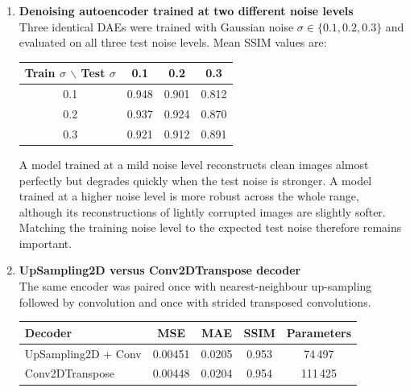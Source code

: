 \documentclass[10pt]{article}
\begin{document}
\begin{enumerate}
Each model works best on the noise it saw during training. The Gaussian-trained network still removes moderate salt-and-pepper corruption reasonably well, while the salt-and-pepper network struggles more with additive Gaussian noise. This shows that the denoising autoencoder learns noise-specific features rather than a completely universal cleaner.\\

\item \textbf{Denoising autoencoder trained at two different noise levels}
\\[0.3em]
Three identical DAEs were trained with Gaussian noise $\sigma\in\{0.1,0.2,0.3\}$ and evaluated on all three test noise levels. Mean SSIM values are:

\begin{center}
\begin{tabular}{|c|c|c|c|}
\hline
Train $\sigma$ $\backslash$ Test $\sigma$ & 0.1 & 0.2 & 0.3 \\
\hline
0.1 & 0.948 & 0.901 & 0.812 \\
0.2 & 0.937 & 0.924 & 0.870 \\
0.3 & 0.921 & 0.912 & 0.891 \\
\hline
\end{tabular}
\end{center}

A model trained at a mild noise level reconstructs clean images almost perfectly but degrades quickly when the test noise is stronger. A model trained at a higher noise level is more robust across the whole range, although its reconstructions of lightly corrupted images are slightly softer. Matching the training noise level to the expected test noise therefore remains important.\\

\item \textbf{UpSampling2D versus Conv2DTranspose decoder}
\\[0.3em]
The same encoder was paired once with nearest-neighbour up-sampling followed by convolution and once with strided transposed convolutions.

\begin{center}
\begin{tabular}{|l|c|c|c|c|}
\hline
Decoder & MSE & MAE & SSIM & Parameters \\
\hline
UpSampling2D + Conv & 0.00451 & 0.0205 & 0.953 & 74\,497 \\
Conv2DTranspose     & 0.00448 & 0.0204 & 0.954 & 111\,425 \\
\hline
\end{tabular}
\end{center}


\end{enumerate}
\end{document}
